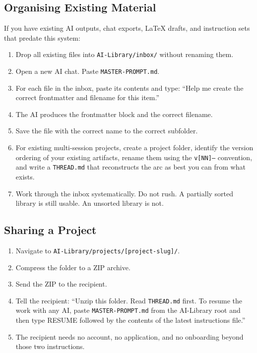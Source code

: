 \documentclass[12pt,letterpaper]{article}
\begin{document}
\subsection{Organising Existing Material}

If you have existing AI outputs, chat exports, LaTeX drafts, and instruction
sets that predate this system:

\begin{enumerate}
  \item Drop all existing files into \texttt{AI-Library/inbox/}
        without renaming them.

  \item Open a new AI chat. Paste \texttt{MASTER-PROMPT.md}.

  \item For each file in the inbox, paste its contents and type:
        ``Help me create the correct frontmatter and filename for this item.''

  \item The AI produces the frontmatter block and the correct filename.

  \item Save the file with the correct name to the correct subfolder.

  \item For existing multi-session projects, create a project folder,
        identify the version ordering of your existing artifacts, rename them
        using the \texttt{v[NN]--} convention, and write a \texttt{THREAD.md}
        that reconstructs the arc as best you can from what exists.

  \item Work through the inbox systematically. Do not rush.
        A partially sorted library is still usable. An unsorted library is not.
\end{enumerate}

\subsection{Sharing a Project}

\begin{enumerate}
  \item Navigate to \texttt{AI-Library/projects/[project-slug]/}.

  \item Compress the folder to a ZIP archive.

  \item Send the ZIP to the recipient.

  \item Tell the recipient: ``Unzip this folder. Read \texttt{THREAD.md} first.
        To resume the work with any AI, paste \texttt{MASTER-PROMPT.md} from
        the AI-Library root and then type RESUME followed by the contents of
        the latest instructions file.''

  \item The recipient needs no account, no application, and no onboarding
        beyond those two instructions.
\end{enumerate}
\end{document}
